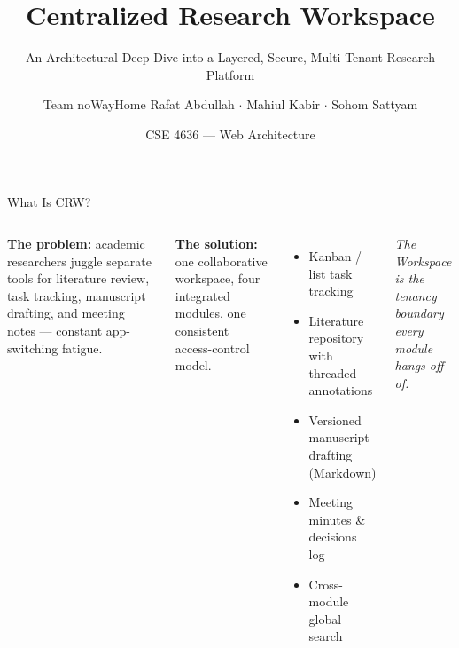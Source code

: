 \documentclass[aspectratio=169, 10pt]{beamer}
\title{Centralized Research Workspace}
\subtitle{An Architectural Deep Dive into a Layered, Secure, Multi-Tenant Research Platform}
\author{Team noWayHome \;\textbar\; Rafat Abdullah \(\cdot\) Mahiul Kabir \(\cdot\) Sohom Sattyam}
\date{CSE 4636 --- Web Architecture}
\begin{document}
\begin{frame}
  \titlepage
\end{frame}

\begin{frame}{What Is CRW?}
  \begin{columns}[T,onlytextwidth]
      \textbf{The problem:} academic researchers juggle separate tools for literature review, task tracking, manuscript drafting, and meeting notes --- constant \alert{app-switching fatigue}.

      \vspace{0.4cm}
      \textbf{The solution:} one collaborative workspace, four integrated modules, one consistent access-control model.

      \vspace{0.4cm}
      \begin{itemize}\setlength\itemsep{4pt}
        \item[$\bullet$] Kanban / list task tracking
        \item[$\bullet$] Literature repository with threaded annotations
        \item[$\bullet$] Versioned manuscript drafting (Markdown)
        \item[$\bullet$] Meeting minutes \& decisions log
        \item[$\bullet$] Cross-module global search
      \end{itemize}
      \small\centering \textit{The Workspace is the tenancy boundary every module hangs off of.}
  \end{columns}
\end{frame}
\end{document}
